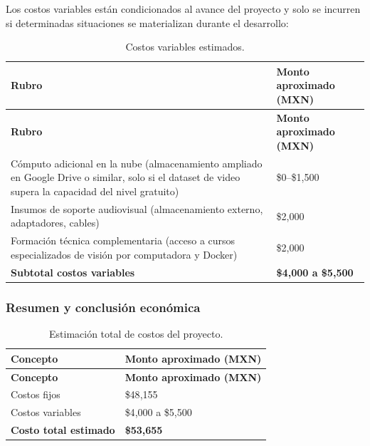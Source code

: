 Los costos variables están condicionados al avance del proyecto y solo se incurren si
determinadas situaciones se materializan durante el desarrollo:

\begin{longtable}{|p{6.5cm}|p{6.8cm}|}
\caption{Costos variables estimados.
\label{tab:costos_variables}}\\
\hline
\textbf{Rubro} & \textbf{Monto aproximado (MXN)} \\
\hline
\endfirsthead
\hline
\textbf{Rubro} & \textbf{Monto aproximado (MXN)} \\
\hline
\endhead
\hline
\endfoot

Cómputo adicional en la nube (almacenamiento ampliado en Google Drive o similar,
      solo si el dataset de video supera la capacidad del nivel gratuito)
    & \$0--\$1{,}500 \\
\hline
Insumos de soporte audiovisual (almacenamiento externo, adaptadores, cables)
    & \$2{,}000 \\
\hline
Formación técnica complementaria (acceso a cursos especializados de visión por
      computadora y Docker)
    & \$2{,}000 \\
\hline
\textbf{Subtotal costos variables} & \textbf{\$4{,}000 a \$5{,}500} \\
\hline

\end{longtable}

\subsubsection{Resumen y conclusión económica}

\begin{longtable}{|p{6.5cm}|p{6.8cm}|}
\caption{Estimación total de costos del proyecto.
\label{tab:costos_total}}\\
\hline
\textbf{Concepto} & \textbf{Monto aproximado (MXN)} \\
\hline
\endfirsthead
\hline
\textbf{Concepto} & \textbf{Monto aproximado (MXN)} \\
\hline
\endhead
\hline
\endfoot

Costos fijos & \$48{,}155 \\
\hline
Costos variables & \$4{,}000 a \$5{,}500 \\
\hline
\textbf{Costo total estimado} & \textbf{\$53{,}655} \\
\hline

\end{longtable}

